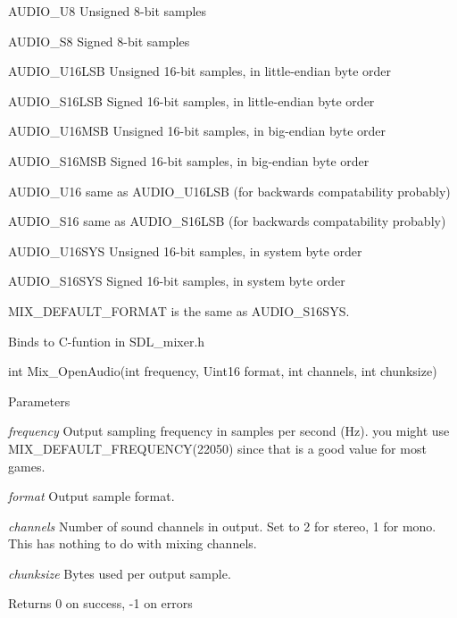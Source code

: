 \begin{DoxyCode}
                    AUDIO_U8
                    Unsigned 8-bit samples

                    AUDIO_S8
                    Signed 8-bit samples

                    AUDIO_U16LSB
                    Unsigned 16-bit samples, in little-endian byte order

                    AUDIO_S16LSB
                    Signed 16-bit samples, in little-endian byte order

                    AUDIO_U16MSB
                    Unsigned 16-bit samples, in big-endian byte order

                    AUDIO_S16MSB
                    Signed 16-bit samples, in big-endian byte order

                    AUDIO_U16
                    same as AUDIO_U16LSB (for backwards compatability probably)

                    AUDIO_S16
                    same as AUDIO_S16LSB (for backwards compatability probably)

                    AUDIO_U16SYS
                    Unsigned 16-bit samples, in system byte order

                    AUDIO_S16SYS
                    Signed 16-bit samples, in system byte order
\end{DoxyCode}


MIX\_\-DEFAULT\_\-FORMAT is the same as AUDIO\_\-S16SYS. 

Binds to C-\/funtion in SDL\_\-mixer.h 
\begin{DoxyCode}
                    int Mix_OpenAudio(int frequency, Uint16 format, int channels,
       int chunksize)
\end{DoxyCode}



\begin{DoxyParams}{Parameters}
\item[{\em frequency}]Output sampling frequency in samples per second (Hz). you might use MIX\_\-DEFAULT\_\-FREQUENCY(22050) since that is a good value for most games. \item[{\em format}]Output sample format. \item[{\em channels}]Number of sound channels in output. Set to 2 for stereo, 1 for mono. This has nothing to do with mixing channels. \item[{\em chunksize}]Bytes used per output sample. \end{DoxyParams}
\begin{DoxyReturn}{Returns}
0 on success, -\/1 on errors 
\end{DoxyReturn}

